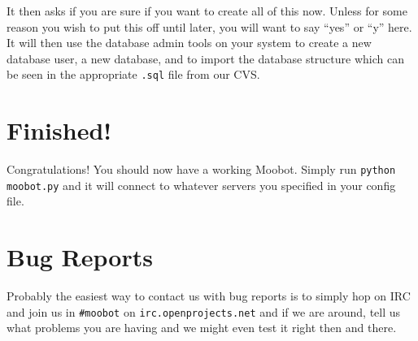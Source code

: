 \documentclass{article}
\begin{document}
It then asks if you are sure if you want to create all of this now.  Unless
for some reason you wish to put this off until later, you will want to say
``yes'' or ``y'' here.  It will then use the database admin tools on your
system to create a new database user, a new database, and to import the
database structure which can be seen in the appropriate \texttt{.sql} file
from our CVS.

\section{Finished!}
Congratulations!  You should now have a working Moobot.  Simply run
\texttt{python moobot.py} and it will connect to whatever servers you
specified in your config file.

\section{Bug Reports}
Probably the easiest way to contact us with bug reports is to simply hop on
IRC and join us in \texttt{\#moobot} on \texttt{irc.openprojects.net} and if we
are around, tell us what problems you are having and we might even test it
right then and there.
\end{document}
